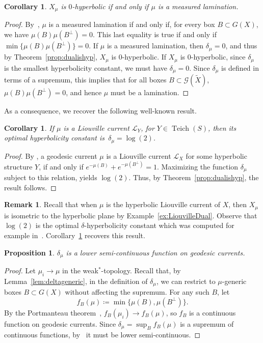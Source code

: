 \documentclass[12pt,article]{amsart}
\numberwithin{equation}{section}
\numberwithin{figure}{section}
\newtheorem{corollary}[equation]{Corollary}
\newtheorem{proposition}[equation]{Proposition}
\theoremstyle{definition}
\newtheorem{remark}[equation]{Remark}
\theoremstyle{plain}
\newcommand\G{\ensuremath{\mathcal{G}}}
\DeclareMathOperator{\Teich}{Teich}
\newcommand*{\wt}[1]{\widetilde{#1}}
\begin{document}
\begin{corollary}
$X_{\mu}$ is $0$-hyperbolic if and only if $\mu$ is a measured lamination.
\label{cor:0hyp}
\end{corollary}
\begin{proof}
By~\cite[Proposition~2.1]{BIPP21:Crossratios}, $\mu$ is a measured lamination if and only if, for every box $B \subset G(X)$, we have $\mu(B)\mu(B^{\perp})=0$. This last equality is true if and only if $\min \{ \mu(B)\mu(B^{\perp})\}=0$.
If $\mu$ is a measured lamination, then $\delta_{\mu}=0$, and thus by Theorem~\ref{prop:dualishyp}, $X_{\mu}$ is $0$-hyperbolic.
If $X_{\mu}$ is $0$-hyperbolic, since $\delta_{\mu}$ is the smallest hyperbolicity constant, we must have $\delta_{\mu}=0$. Since $\delta_{\mu}$ is defined in terms of a supremum, this implies that for all boxes $B \subset \G(\wt{X})$, $\mu(B)\mu(B^{\perp})=0$, and hence $\mu$ must be a lamination.
\end{proof}

As a consequence, we recover the following well-known result.

\begin{corollary}
If $\mu$ is a Liouville current $\mathcal{L}_Y$, for $Y \in \Teich(S)$, then its optimal hyperbolicity constant is~$\delta_{\mu}=\log(2)$.
\label{cor:hypplanedelta}
\end{corollary}
\begin{proof}
By \cite[Theorem~13]{Bonahon88:GeodesicCurrent}, a geodesic current $\mu$ is a Liouville current $\mathcal{L}_X$ for some hyperbolic structure $Y$, if and only if $e^{-\mu(B)} + e^{-\mu(B^{\perp})}=1$. Maximizing the function $\delta_{\mu}$ subject to this relation, yields $\log(2)$. Thus, by Theorem~\ref{prop:dualishyp}, the result follows.
\end{proof}
\begin{remark}
Recall that when $\mu$ is the hyperbolic Liouville current of $X$, then $X_{\mu}$ is isometric to the hyperbolic plane by Example~\ref{ex:LiouvilleDual}.
Observe that $\log(2)$ is the optimal $\delta$-hyperbolicity constant which was computed for example in~\cite[Corollary~5.4]{BS16:StrongHyp}.
Corollary~\ref{cor:hypplanedelta} recovers this result.
\label{rmk:hypplanedual}
\end{remark}

\begin{proposition}
$\delta_{\mu}$ is a lower semi-continuous function on geodesic currents.
\end{proposition}
\begin{proof}
Let $\mu_i \to \mu$ in the weak$^*$-topology.
Recall that, by Lemma~\ref{lem:deltageneric}, in the definition of $\delta_{\mu}$, we can restrict to $\mu$-generic boxes $B \subset G(X)$ without affecting the supremum.
For any such $B$, let 
\[
f_B(\mu) \coloneqq \min \{ \mu(B), \mu(B^{\perp}) \}.
\]
By the Portmanteau theorem~\cite[Theorem~30.12]{Bau01:Measure}, $f_B(\mu_i) \to f_B(\mu)$, so $f_B$ is a continuous function on geodesic currents. Since $\delta_{\mu}=\sup_{B} f_B(\mu)$
is a supremum of continuous functions, by~\cite[Theorem~10.3]{vR82:RealAnalysis} it must be lower semi-continuous. 
\end{proof}
\end{document}
